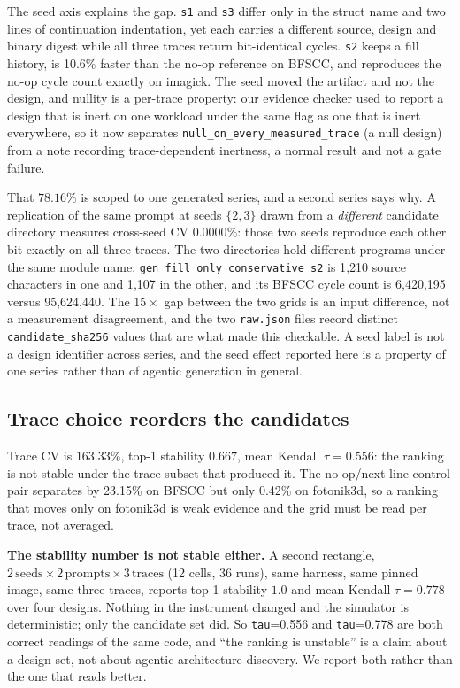 \documentclass[10pt,twocolumn]{article}
\begin{document}
The seed axis explains the gap. \texttt{s1} and \texttt{s3} differ only in the
struct name and two lines of continuation indentation, yet each carries a
different source, design and binary digest while all three traces return
bit-identical cycles. \texttt{s2} keeps a fill history, is 10.6\% faster than the
no-op reference on BFSCC, and reproduces the no-op cycle count exactly on
imagick. The seed moved the artifact and not the design, and nullity is a per-trace
property: our evidence checker used to report a design that is inert on one workload
under the same flag as one that is inert everywhere, so it now separates
\texttt{null\_on\_every\_measured\_trace} (a null design) from a note recording
trace-dependent inertness, a normal result and not a gate failure.

That $78.16\%$ is scoped to one generated series, and a second series says why.
A replication of the same prompt at seeds $\{2,3\}$ drawn from a \emph{different}
candidate directory measures cross-seed CV $\mathbf{0.0000\%}$: those two seeds
reproduce each other bit-exactly on all three traces. The two directories hold
different programs under the same module name: \texttt{gen\_fill\_only\_conservative\_s2}
is 1{,}210 source characters in one and 1{,}107 in the other, and its BFSCC cycle
count is 6{,}420{,}195 versus 95{,}624{,}440. The $15\times$ gap between the two
grids is an input difference, not a measurement disagreement, and the two
\texttt{raw.json} files record distinct \texttt{candidate\_sha256} values that are
what made this checkable. A seed label is not a design identifier across series, and
the seed effect reported here is a property of one series rather than of agentic
generation in general.

\subsection{Trace choice reorders the candidates}
\label{sec:trace}

Trace CV is $163.33\%$, top-1 stability $0.667$, mean Kendall $\tau=0.556$: the
ranking is not stable under the trace subset that produced it. The
no-op/next-line control pair separates by 23.15\% on BFSCC but only 0.42\% on
fotonik3d, so a ranking that moves only on fotonik3d is weak evidence and the
grid must be read per trace, not averaged.

\textbf{The stability number is not stable either.} A second rectangle,
$2\,\text{seeds}\times2\,\text{prompts}\times3\,\text{traces}$ (12 cells, 36 runs),
same harness, same pinned image, same three traces, reports top-1 stability
$\mathbf{1.0}$ and mean Kendall $\tau=\mathbf{0.778}$ over four designs. Nothing in
the instrument changed and the simulator is deterministic; only the candidate set
did. So \texttt{tau}=0.556 and \texttt{tau}=0.778 are both correct readings of the
same code, and ``the ranking is unstable'' is a claim about a design set, not about
agentic architecture discovery. We report both rather than the one that reads better.
\end{document}
